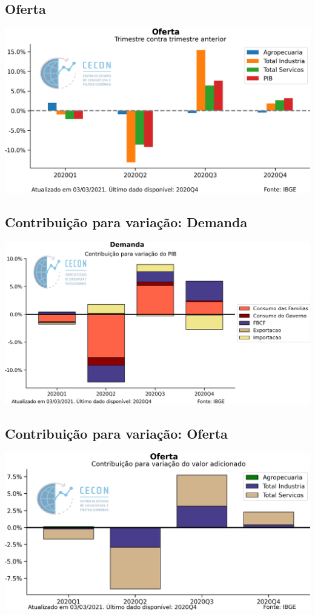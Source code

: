 \documentclass{SelfArx}
\begin{document}
\subsection*{Oferta}
\label{sec:org3fae1ae}


\begin{center}
\includegraphics[width=.9\linewidth]{./figs/PIB/Oferta.png}
\end{center}


\subsection*{Contribuição para variação: Demanda}
\label{sec:orgfbcb72a}

\begin{center}
\includegraphics[width=.9\linewidth]{./figs/PIB/Contrib_Demanda.png}
\end{center}

\subsection*{Contribuição para variação: Oferta}
\label{sec:org5b084b3}

\begin{center}
\includegraphics[width=.9\linewidth]{./figs/PIB/Contrib_Oferta.png}
\end{center}
\end{document}
